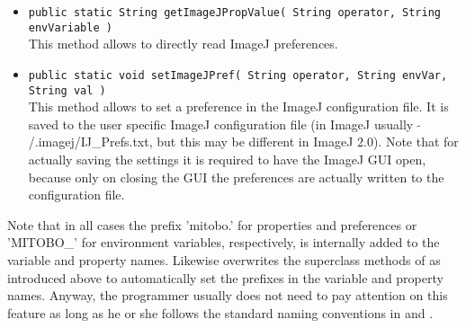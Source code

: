 \begin{itemize}
    \item {\small \texttt{public static String getImageJPropValue( String operator, String envVariable )}}\\[0.2cm] 
    	This method allows to directly read ImageJ preferences.  
    \item {\small \texttt{public static void setImageJPref( String operator, String envVar, String val )}}\\[0.2cm]
    	This method allows to set a preference in the ImageJ configuration file.
    	It is saved to the user specific ImageJ configuration file (in ImageJ usually $\;\tilde{ }$/.imagej/IJ\_Prefs.txt, but this
    	may be different in ImageJ $2.0$). Note that for actually saving the settings it is required to have the ImageJ GUI open,
    	because only on closing the GUI the preferences are actually written to the configuration file.
\end{itemize}
Note that in all cases the prefix 'mitobo.' for properties and preferences or 'MITOBO\_' for environment variables,
respectively, is internally added to the variable and property names. Likewise \mitobo overwrites the superclass methods of \alida 
as introduced above to automatically
set the \mitobo prefixes in the variable and property names. Anyway, the programmer usually does not need to pay
attention on this feature as long as he or she follows the standard naming conventions in \alida and \mitobo.